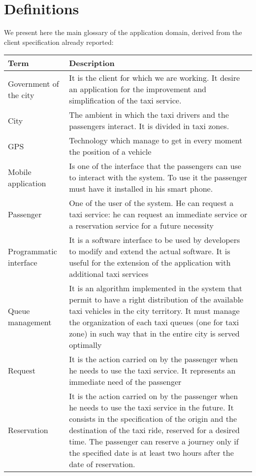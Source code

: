 \section{Definitions}
We present here the main glossary of the application domain, derived from the client specification already reported:
\begin{table}[]
\centering
\begin{tabularx}{\textwidth}{|l|X|} \hline
{\Large \textbf{Term}} & {\Large \textbf{Description}} \\ \hline
Government of the city & It is the client for which we are working.  It desire an application for the improvement and simplification of the taxi service. \\ \hline
City & The ambient in which the taxi drivers and the passengers interact. It is divided in taxi zones. \\ \hline
GPS & Technology which manage to get in every moment the position of a vehicle \\ \hline
Mobile application & Is one of the interface that the passengers can use to interact with the system. To use it the passenger must have it installed in his smart phone. \\ \hline
Passenger & One of the user of the system. He can request a taxi service: he can request an immediate service or a reservation service for a future necessity \\ \hline
Programmatic interface & It is a software interface to be used by developers to modify and extend the actual software. It is useful for the extension of the application with additional taxi services \\ \hline
Queue management & It is an algorithm implemented in the system that permit to have a right distribution of the available taxi vehicles in the city territory. It must manage the organization of each taxi queues (one for taxi zone) in such way that in the entire city is served optimally \\ \hline
Request & It is the action carried on by the passenger when he needs to use the taxi service. It represents an immediate need of the passenger \\ \hline
Reservation & It is the action carried on by the passenger when he needs to use the taxi service in the future. It consists in the specification of the origin and the destination of the taxi ride, reserved for a desired time. The passenger can reserve a journey only if the specified date is at least two hours after the date of reservation. \\ \hline

\end{tabularx}
\end{table}

